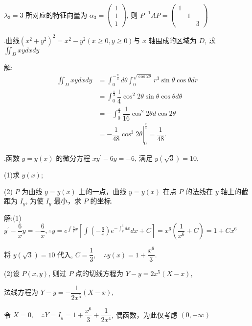 \documentclass{article}
\begin{document}
$\lambda_{3}=3$ 所对应的特征向量为 $\alpha_{3}=\left(\begin{array}{l}1 \\ 1 \\ 1\end{array}\right)$, 则 $P^{-1} A P=\left(\begin{array}{lll}1 & & \\ & 1 & \\ & & 3\end{array}\right)$

\vspace{1ex}
{.}曲线$\left(x^{2}+y^{2}\right)^{2}=x^{2}-y^{2}(x \geq 0, y \geq 0) $与  $x $ 轴围成的区域为 $D$, 求$ \iint_{D} x y dxdy $

解: $$
    \begin{aligned}
        \iint_{D} x y d x d y & =\int_{0}^{-\frac{\pi}{4}} d \theta \int_{0}^{\sqrt{\cos 2 \theta}} r^{3} \sin \theta \cos \theta d r \\
                              & =\int_{0}^{\frac{\pi}{4}} \dfrac{1}{4} \cos ^{2} 2 \theta \sin \theta \cos \theta d \theta            \\
                              & =-\int_{0}^{\frac{\pi}{4}} \dfrac{1}{16} \cos ^{2} 2 \theta d \cos 2 \theta                           \\
                              & =-\left.\dfrac{1}{48} \cos ^{3} 2 \theta\right|_{0} ^{\frac{\pi}{4}}=\dfrac{1}{48} .
    \end{aligned}
$$

\vspace{1ex}
{.}函数 $y=y(x)$ 的微分方程 $x y^{\prime}-6 y=-6$, 满足 $y(\sqrt{3})=10$,

(1)求 $y(x)$;

(2) $P$ 为曲线 $y=y(x)$ 上的一点，曲线 $y=y(x)$ 在点 $P$ 的法线在 $y$ 轴上的截距为 $I_{y}$, 为使 $I_{y}$ 最小，求 $P$ 的坐标.

解:(1) $y^{\prime}-\dfrac{6}{x} y=-\dfrac{6}{x}, \therefore y=e^{\int \frac{6}{x} x}\left[\int\left(-\frac{6}{x}\right) e^{-\int_{x}^{6} d x} d x+C\right]=x^{6}\left(\dfrac{1}{x^{6}}+C\right)=1+C x^{6}$

将 $y(\sqrt{3})=10$ 代入, $C=\dfrac{1}{3}, \quad \therefore y(x)=1+\dfrac{x^{6}}{3}$.

(2)设 $P(x, y)$, 则过 $P$ 点的切线方程为 $Y-y=2 x^{5}(X-x)$,

法线方程为 $Y-y=-\dfrac{1}{2 x^{5}}(X-x)$,

令 $X=0, \quad \therefore Y=I_{y}=1+\dfrac{x^{6}}{3}+\dfrac{1}{2 x^{4}}$, 偶函数，为此仅考虑 $(0,+\infty)$
\end{document}
